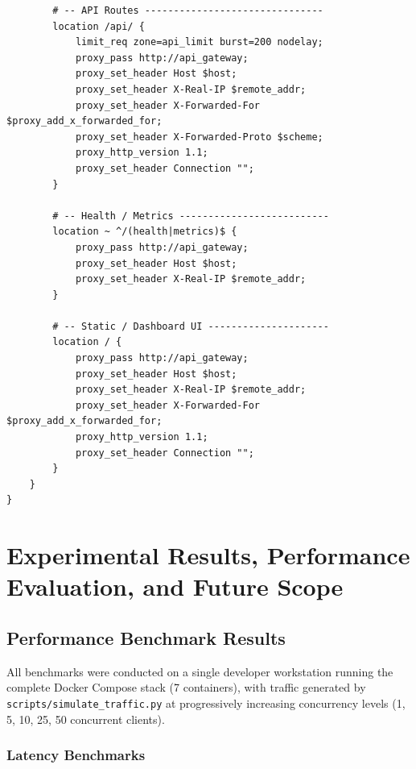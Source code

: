 \documentclass[12pt,a4paper]{report}
\begin{document}
\begin{lstlisting}
        # -- API Routes -------------------------------
        location /api/ {
            limit_req zone=api_limit burst=200 nodelay;
            proxy_pass http://api_gateway;
            proxy_set_header Host $host;
            proxy_set_header X-Real-IP $remote_addr;
            proxy_set_header X-Forwarded-For $proxy_add_x_forwarded_for;
            proxy_set_header X-Forwarded-Proto $scheme;
            proxy_http_version 1.1;
            proxy_set_header Connection "";
        }

        # -- Health / Metrics --------------------------
        location ~ ^/(health|metrics)$ {
            proxy_pass http://api_gateway;
            proxy_set_header Host $host;
            proxy_set_header X-Real-IP $remote_addr;
        }

        # -- Static / Dashboard UI ---------------------
        location / {
            proxy_pass http://api_gateway;
            proxy_set_header Host $host;
            proxy_set_header X-Real-IP $remote_addr;
            proxy_set_header X-Forwarded-For $proxy_add_x_forwarded_for;
            proxy_http_version 1.1;
            proxy_set_header Connection "";
        }
    }
}
\end{lstlisting}
\newpage


\chapter{Experimental Results, Performance Evaluation, and Future Scope}

\section{Performance Benchmark Results}

All benchmarks were conducted on a single developer workstation running the
complete Docker Compose stack (7 containers), with traffic generated by
\texttt{scripts/simulate\_traffic.py} at progressively increasing concurrency
levels (1, 5, 10, 25, 50 concurrent clients).

\subsection{Latency Benchmarks}
\end{document}
